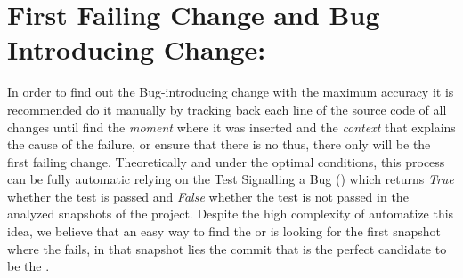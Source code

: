 \documentclass[a4paper, 12pt]{book}
\begin{document}




\section{First Failing Change and Bug Introducing Change:}
In order to find out the Bug-introducing change with the maximum accuracy it is recommended do it manually by tracking back each line of the source code of all changes until find the \emph{moment} where it was inserted and the \emph{context} that explains the cause of the failure, or ensure that there is no \BIC thus, there only will be the first failing change. Theoretically and under the optimal conditions, this process can be fully automatic relying on the Test Signalling a Bug (\TSB) which returns \emph{True} whether the test is passed and \emph{False} whether the test is not passed in the analyzed snapshots of the project. Despite the high complexity of automatize this idea, we believe that an easy way to find the \BIC or \FFC is looking for the first snapshot where the \TSB fails, in that snapshot lies the commit that is the perfect candidate to be the \BIC.
\end{document}
